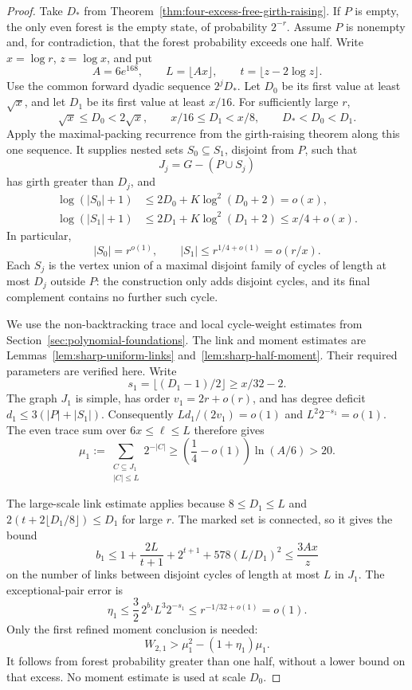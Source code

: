 \begin{proof}
Take $D_*$ from Theorem~\ref{thm:four-excess-free-girth-raising}.
If $P$ is empty, the only even forest is the empty state, of probability $2^{-r}$.
Assume $P$ is nonempty and, for contradiction, that the forest probability exceeds one half.
Write $x=\log r$, $z=\log x$, and put
\[
 A=6e^{168},\qquad
 L=\lfloor Ax\rfloor,\qquad
 t=\lfloor z-2\log z\rfloor.
\]
Use the common forward dyadic sequence $2^jD_*$.
Let $D_0$ be its first value at least $\sqrt x$, and let $D_1$ be its first value at least $x/16$.
For sufficiently large $r$,
\[
 \sqrt x\le D_0<2\sqrt x,\qquad
 x/16\le D_1<x/8,\qquad D_*<D_0<D_1.
\]
Apply the maximal-packing recurrence from the girth-raising theorem along this one sequence.
It supplies nested sets $S_0\subseteq S_1$, disjoint from $P$, such that
\[
 J_j=G-(P\cup S_j)
\]
has girth greater than $D_j$, and
\begin{align*}
 \log(|S_0|+1)
 &\le2D_0+K\log^2(D_0+2)=o(x),\\
 \log(|S_1|+1)
 &\le2D_1+K\log^2(D_1+2)
 \le x/4+o(x).
\end{align*}
In particular,
\[
 |S_0|=r^{o(1)},\qquad |S_1|\le r^{1/4+o(1)}=o(r/x).
\]
Each $S_j$ is the vertex union of a maximal disjoint family of cycles of length at most $D_j$ outside $P$:
the construction only adds disjoint cycles, and its final complement contains no further such cycle.

We use the non-backtracking trace and local cycle-weight estimates from Section~\ref{sec:polynomial-foundations}.
The link and moment estimates are Lemmas~\ref{lem:sharp-uniform-links} and~\ref{lem:sharp-half-moment}.
Their required parameters are verified here.
Write
\[
 s_1=\lfloor(D_1-1)/2\rfloor\ge x/32-2.
\]
The graph $J_1$ is simple, has order $v_1=2r+o(r)$, and has degree deficit
$d_1\le3(|P|+|S_1|)$.
Consequently $Ld_1/(2v_1)=o(1)$ and $L^2 2^{-s_1}=o(1)$.
The even trace sum over $6x\le\ell\le L$ therefore gives
\[
 \mu_1:=
 \sum_{\substack{C\subseteq J_1\\|C|\le L}}2^{-|C|}
 \ge\left(\frac14-o(1)\right)\ln(A/6)>20.
\]

The large-scale link estimate applies because $8\le D_1\le L$ and
$2(t+2\lfloor D_1/8\rfloor)\le D_1$ for large $r$.
The marked set is connected, so it gives the bound
\[
 b_1\le
 1+\frac{2L}{t+1}+2^{t+1}+578(L/D_1)^2
 \le\frac{3Ax}{z}
\]
on the number of links between disjoint cycles of length at most $L$ in $J_1$.
The exceptional-pair error is
\[
 \eta_1\le\frac32\,2^{b_1}L^3 2^{-s_1}
 \le r^{-1/32+o(1)}=o(1).
\]
Only the first refined moment conclusion is needed:
\[
 W_{2,1}>\mu_1^2-(1+\eta_1)\mu_1.
\]
It follows from forest probability greater than one half, without a lower bound on that excess.
No moment estimate is used at scale $D_0$.


\end{proof}
